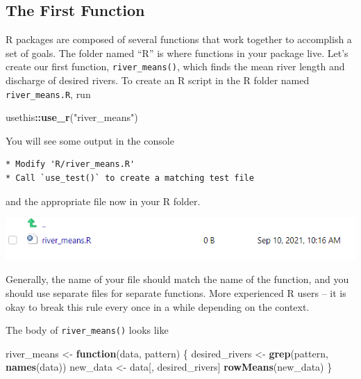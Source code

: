 \documentclass[
]{book}
\newenvironment{Shaded}{\begin{snugshade}}{\end{snugshade}}
\newcommand{\ControlFlowTok}[1]{\textcolor[rgb]{0.13,0.29,0.53}{\textbf{#1}}}
\newcommand{\KeywordTok}[1]{\textcolor[rgb]{0.13,0.29,0.53}{\textbf{#1}}}
\newcommand{\NormalTok}[1]{#1}
\newcommand{\OperatorTok}[1]{\textcolor[rgb]{0.81,0.36,0.00}{\textbf{#1}}}
\newcommand{\StringTok}[1]{\textcolor[rgb]{0.31,0.60,0.02}{#1}}
\begin{document}
\hypertarget{first-function}{%
\subsection{The First Function}\label{first-function}}

R packages are composed of several functions that work together to accomplish a set of goals. The folder named ``R'' is where functions in your package live. Let's create our first function, \texttt{river\_means()}, which finds the mean river length and discharge of desired rivers. To create an R script in the R folder named \texttt{river\_means.R}, run

\begin{Shaded}
\begin{Highlighting}[]
\NormalTok{usethis}\OperatorTok{::}\KeywordTok{use_r}\NormalTok{(}\StringTok{"river_means"}\NormalTok{)}
\end{Highlighting}
\end{Shaded}

You will see some output in the console

\begin{verbatim}
* Modify 'R/river_means.R'
* Call `use_test()` to create a matching test file 
\end{verbatim}

and the appropriate file now in your R folder.

\includegraphics[width=1\linewidth]{images/newrpack_function}

Generally, the name of your file should match the name of the function, and you should use separate files for separate functions. More experienced R users -- it is okay to break this rule every once in a while depending on the context.

The body of \texttt{river\_means()} looks like

\begin{Shaded}
\begin{Highlighting}[]
\NormalTok{river_means <-}\StringTok{ }\ControlFlowTok{function}\NormalTok{(data, pattern) \{}
\NormalTok{  desired_rivers <-}\StringTok{ }\KeywordTok{grep}\NormalTok{(pattern, }\KeywordTok{names}\NormalTok{(data))}
\NormalTok{  new_data <-}\StringTok{ }\NormalTok{data[, desired_rivers]}
  \KeywordTok{rowMeans}\NormalTok{(new_data)}
\NormalTok{\}}
\end{Highlighting}
\end{Shaded}
\end{document}
